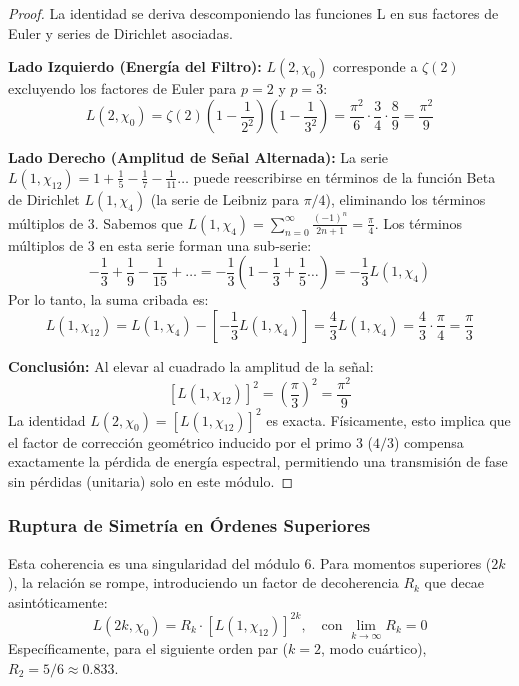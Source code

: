 \documentclass[12pt, a4paper]{article}
\theoremstyle{plain}
\theoremstyle{definition}
\begin{document}
\begin{proof}
La identidad se deriva descomponiendo las funciones L en sus factores de Euler y series de Dirichlet asociadas.

\textbf{Lado Izquierdo (Energía del Filtro):}
$L(2, \chi_0)$ corresponde a $\zeta(2)$ excluyendo los factores de Euler para $p=2$ y $p=3$:
\begin{equation}
    L(2, \chi_0) = \zeta(2) \left(1 - \frac{1}{2^2}\right) \left(1 - \frac{1}{3^2}\right) = \frac{\pi^2}{6} \cdot \frac{3}{4} \cdot \frac{8}{9} = \frac{\pi^2}{9}
\end{equation}

\textbf{Lado Derecho (Amplitud de Señal Alternada):}
La serie $L(1, \chi_{12}) = 1 + \frac{1}{5} - \frac{1}{7} - \frac{1}{11} \dots$ puede reescribirse en términos de la función Beta de Dirichlet $L(1, \chi_4)$ (la serie de Leibniz para $\pi/4$), eliminando los términos múltiplos de 3.
Sabemos que $L(1, \chi_4) = \sum_{n=0}^\infty \frac{(-1)^n}{2n+1} = \frac{\pi}{4}$.
Los términos múltiplos de 3 en esta serie forman una sub-serie:
\[ -\frac{1}{3} + \frac{1}{9} - \frac{1}{15} + \dots = -\frac{1}{3} \left( 1 - \frac{1}{3} + \frac{1}{5} \dots \right) = -\frac{1}{3} L(1, \chi_4) \]
Por lo tanto, la suma cribada es:
\begin{equation}
    L(1, \chi_{12}) = L(1, \chi_4) - \left[ -\frac{1}{3} L(1, \chi_4) \right] = \frac{4}{3} L(1, \chi_4) = \frac{4}{3} \cdot \frac{\pi}{4} = \frac{\pi}{3}
\end{equation}

\textbf{Conclusión:}
Al elevar al cuadrado la amplitud de la señal:
\begin{equation}
    \left[ L(1, \chi_{12}) \right]^2 = \left( \frac{\pi}{3} \right)^2 = \frac{\pi^2}{9}
\end{equation}
La identidad $L(2, \chi_0) = [L(1, \chi_{12})]^2$ es exacta. Físicamente, esto implica que el factor de corrección geométrico inducido por el primo 3 ($4/3$) compensa exactamente la pérdida de energía espectral, permitiendo una transmisión de fase sin pérdidas (unitaria) solo en este módulo.
\end{proof}

\subsubsection{Ruptura de Simetría en Órdenes Superiores}
Esta coherencia es una singularidad del módulo 6. Para momentos superiores ($2k$), la relación se rompe, introduciendo un factor de decoherencia $R_k$ que decae asintóticamente:
\begin{equation}
    L(2k, \chi_0) = R_k \cdot [L(1, \chi_{12})]^{2k}, \quad \text{con } \lim_{k \to \infty} R_k = 0
\end{equation}
Específicamente, para el siguiente orden par ($k=2$, modo cuártico), $R_2 = 5/6 \approx 0.833$. 
\end{document}
